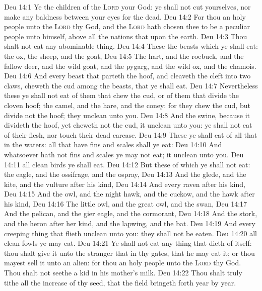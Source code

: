\vs Deu 14:1 Ye  the children of the \textsc{Lord} your God: ye shall not cut yourselves, nor make any baldness between your eyes for the dead.
\vs Deu 14:2 For thou  an holy people unto the \textsc{Lord} thy God, and the \textsc{Lord} hath chosen thee to be a peculiar people unto himself, above all the nations that  upon the earth.
\vs Deu 14:3 Thou shalt not eat any abominable thing.
\vs Deu 14:4 These  the beasts which ye shall eat: the ox, the sheep, and the goat,
\vs Deu 14:5 The hart, and the roebuck, and the fallow deer, and the wild goat, and the pygarg, and the wild ox, and the chamois.
\vs Deu 14:6 And every beast that parteth the hoof, and cleaveth the cleft into two claws,  cheweth the cud among the beasts, that ye shall eat.
\vs Deu 14:7 Nevertheless these ye shall not eat of them that chew the cud, or of them that divide the cloven hoof;  the camel, and the hare, and the coney: for they chew the cud, but divide not the hoof;  they  unclean unto you.
\vs Deu 14:8 And the swine, because it divideth the hoof, yet cheweth not the cud, it  unclean unto you: ye shall not eat of their flesh, nor touch their dead carcase.
\vs Deu 14:9 These ye shall eat of all that  in the waters: all that have fins and scales shall ye eat:
\vs Deu 14:10 And whatsoever hath not fins and scales ye may not eat; it  unclean unto you.
\vs Deu 14:11  all clean birds ye shall eat.
\vs Deu 14:12 But these  of which ye shall not eat: the eagle, and the ossifrage, and the ospray,
\vs Deu 14:13 And the glede, and the kite, and the vulture after his kind,
\vs Deu 14:14 And every raven after his kind,
\vs Deu 14:15 And the owl, and the night hawk, and the cuckow, and the hawk after his kind,
\vs Deu 14:16 The little owl, and the great owl, and the swan,
\vs Deu 14:17 And the pelican, and the gier eagle, and the cormorant,
\vs Deu 14:18 And the stork, and the heron after her kind, and the lapwing, and the bat.
\vs Deu 14:19 And every creeping thing that flieth  unclean unto you: they shall not be eaten.
\vs Deu 14:20  all clean fowls ye may eat.
\vs Deu 14:21 Ye shall not eat  any thing that dieth of itself: thou shalt give it unto the stranger that  in thy gates, that he may eat it; or thou mayest sell it unto an alien: for thou  an holy people unto the \textsc{Lord} thy God. Thou shalt not seethe a kid in his mother's milk.
\vs Deu 14:22 Thou shalt truly tithe all the increase of thy seed, that the field bringeth forth year by year.
